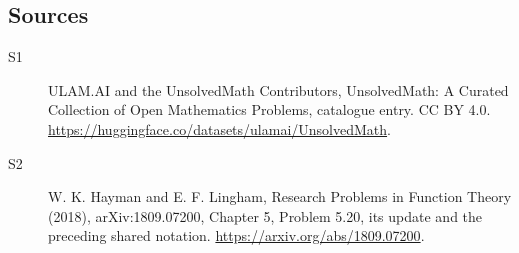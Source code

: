 \documentclass[11pt]{article}
\begin{document}
\subsection{Sources}
\begin{description}
\item[\hypertarget{source:statement:1}{S1}] ULAM.AI and the UnsolvedMath Contributors, UnsolvedMath: A Curated Collection of Open Mathematics Problems, catalogue entry. CC BY 4.0. \url{https://huggingface.co/datasets/ulamai/UnsolvedMath}.
\item[\hypertarget{source:statement:2}{S2}] W. K. Hayman and E. F. Lingham, Research Problems in Function Theory (2018), arXiv:1809.07200, Chapter 5, Problem 5.20, its update and the preceding shared notation. \url{https://arxiv.org/abs/1809.07200}.
\end{description}
\label{end:statement}
\end{document}
